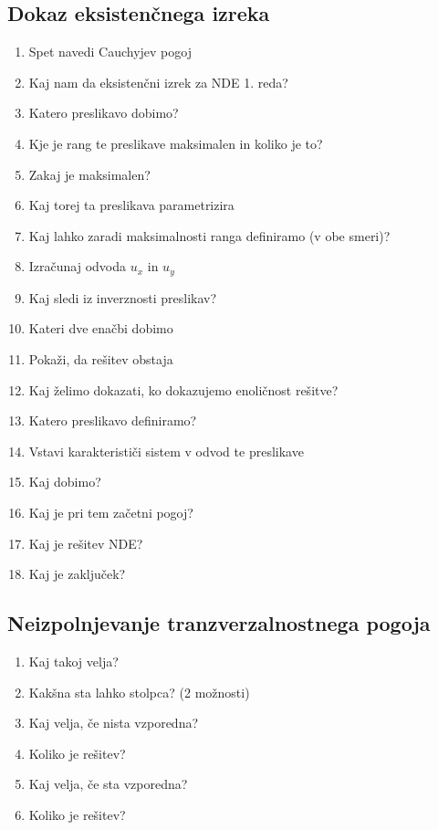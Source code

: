\documentclass{article}
\begin{document}
    \subsection{Dokaz eksistenčnega izreka}
    \begin{enumerate}
        \item Spet navedi Cauchyjev pogoj
        \item Kaj nam da eksistenčni izrek za NDE 1. reda?
        \item Katero preslikavo dobimo?
        \item Kje je rang te preslikave maksimalen in koliko je to?
        \item Zakaj je maksimalen?
        \item Kaj torej ta preslikava parametrizira
        \item Kaj lahko zaradi maksimalnosti ranga definiramo (v obe smeri)?
        \item Izračunaj odvoda $u_x$ in $u_y$
        \item Kaj sledi iz inverznosti preslikav?
        \item Kateri dve enačbi dobimo
        \item Pokaži, da rešitev obstaja
        \item Kaj želimo dokazati, ko dokazujemo enoličnost rešitve?
        \item Katero preslikavo definiramo?
        \item Vstavi karakterističi sistem v odvod te preslikave
        \item Kaj dobimo?
        \item Kaj je pri tem začetni pogoj?
        \item Kaj je rešitev NDE?
        \item Kaj je zaključek?
    \end{enumerate}

    \subsection{Neizpolnjevanje tranzverzalnostnega pogoja}
    \begin{enumerate}
        \item Kaj takoj velja?
        \item Kakšna sta lahko stolpca? (2 možnosti)
        \item Kaj velja, če nista vzporedna?
        \item Koliko je rešitev?
        \item Kaj velja, če sta vzporedna?
        \item Koliko je rešitev?
    \end{enumerate}
\end{document}
